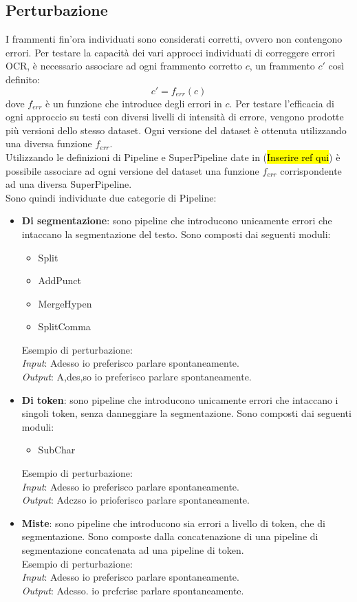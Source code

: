 \documentclass[12pt]{article}
\begin{document}
\subsection{Perturbazione} \label{sec:perturbazione}
I frammenti fin'ora individuati sono considerati corretti, ovvero non contengono errori. Per testare la capacità dei vari approcci individuati di correggere errori OCR, è necessario associare ad ogni frammento corretto $c$, un frammento $c'$ così definito:
\begin{equation}
c' = f_{err}(c)
\end{equation}
dove $f_{err}$ è un funzione che introduce degli errori in $c$.
Per testare l'efficacia di ogni approccio su testi con diversi livelli di intensità di errore, vengono prodotte più versioni dello stesso dataset. Ogni versione del dataset è ottenuta utilizzando una diversa funzione $f_{err}$.\\
Utilizzando le definizioni di Pipeline e SuperPipeline date in (\hl{Inserire ref qui}) è possibile associare ad ogni versione del dataset una funzione $f_{err}$ corrispondente ad una diversa SuperPipeline.\\
Sono quindi individuate due categorie di Pipeline:
\begin{itemize}
\item \textbf{Di segmentazione}: sono pipeline che introducono unicamente errori che intaccano la segmentazione del testo. Sono composti dai seguenti moduli:
	\begin{itemize}
	\item Split
	\item AddPunct
	\item MergeHypen
	\item SplitComma
	\end{itemize}
	Esempio di perturbazione:\\
	\textit{Input}: Adesso io preferisco parlare spontaneamente.\\
	\textit{Output}: A,des,so io preferisco parlare spontaneamente.
\item \textbf{Di token}: sono pipeline che introducono unicamente errori che intaccano i singoli token, senza danneggiare la segmentazione. Sono composti dai seguenti moduli:
	\begin{itemize}
	\item SubChar
	\end{itemize}
	Esempio di perturbazione:\\
	\textit{Input}: Adesso io preferisco parlare spontaneamente.\\
	\textit{Output}: Adczso io prioferisco parlare spontaneamente.
\item \textbf{Miste}: sono pipeline che introducono sia errori a livello di token, che di segmentazione. Sono composte dalla concatenazione di una pipeline di segmentazione concatenata ad una pipeline di token.\\
	Esempio di perturbazione:\\
	\textit{Input}: Adesso io preferisco parlare spontaneamente.\\
	\textit{Output}: Adcsso. io prcfcrisc parlare spontaneamente.
\end{itemize}
\end{document}
